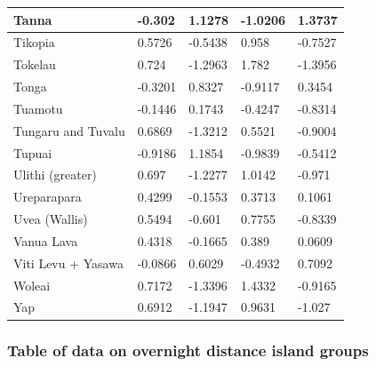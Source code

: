 \documentclass[draft,10pt]{article} %
\begin{document}
\begin{landscape}
\begin{longtable}{| p{2.6cm} |  p{2cm} | p{2cm}  | p{2cm}  | p{2cm}|}
Tanna&-0.302&1.1278&-1.0206&1.3737\\ \hline
Tikopia&0.5726&-0.5438&0.958&-0.7527\\ \hline
Tokelau&0.724&-1.2963&1.782&-1.3956\\ \hline
Tonga&-0.3201&0.8327&-0.9117&0.3454\\ \hline
Tuamotu&-0.1446&0.1743&-0.4247&-0.8314\\ \hline
Tungaru and Tuvalu&0.6869&-1.3212&0.5521&-0.9004\\ \hline
Tupuai&-0.9186&1.1854&-0.9839&-0.5412\\ \hline
Ulithi (greater)&0.697&-1.2277&1.0142&-0.971\\ \hline
Ureparapara&0.4299&-0.1553&0.3713&0.1061\\ \hline
Uvea (Wallis)&0.5494&-0.601&0.7755&-0.8339\\ \hline
Vanua Lava&0.4318&-0.1665&0.389&0.0609\\ \hline
Viti Levu + Yasawa&-0.0866&0.6029&-0.4932&0.7092\\ \hline
Woleai&0.7172&-1.3396&1.4332&-0.9165\\ \hline
Yap&0.6912&-1.1947&0.9631&-1.027\\ \hline

 \end{longtable}
\end{landscape}
\newpage



\subsubsection{Table of data on overnight distance island groups}
\label{overnight_groups}
\end{document}

